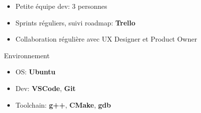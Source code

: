 \begin{cventries}
{\begin{cvitems}
			\begin{itemize}
				\item {Petite équipe dev: 3 personnes}
				\item {Sprints réguliers, suivi roadmap: \textbf{Trello}}
				\item {Collaboration régulière avec UX Designer et Product Owner}
			\end{itemize}
			\item {Environnement}
			\begin{itemize}
				\item {OS: \textbf{Ubuntu}}
				\item {Dev: \textbf{VSCode}, \textbf{Git}}
				\item {Toolchain: \textbf{g++}, \textbf{CMake}, \textbf{gdb}}
			\end{itemize}
		\end{cvitems}
	}

\end{cventries}
